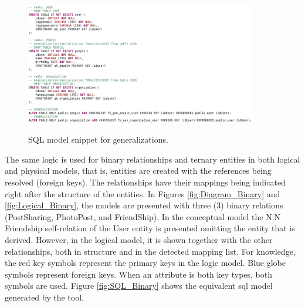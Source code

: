 \begin{figure}[!htb]
    \centering
    \caption{SQL model snippet for generalizations.}
    \includegraphics[width=0.9\textwidth]{img/SQL_Generalization.png}
    \label{fig:SQL_Generalization}
\end{figure}


The same logic is used for binary relationships and ternary entities in both logical and physical models, that is, entities are created with the references being resolved (foreign keys).
The relationships have their mappings being indicated right after the structure of the entities.
In Figures \ref{fig:Diagram_Binary} and \ref{fig:Logical_Binary}, the models are presented with three (3) binary relations (PostSharing, PhotoPost, and FriendShip).
In the conceptual model the N:N Friendship self-relation of the User entity is presented omitting the entity that is derived.
However, in the logical model, it is shown together with the other relationships, both in structure and in the detected mapping list.
For knowledge, the red key symbols represent the primary keys in the logic model.
Blue globe symbols represent foreign keys.
When an attribute is both key types, both symbols are used.
Figure \ref{fig:SQL_Binary} shows the equivalent \ac{sql} model generated by the tool.

